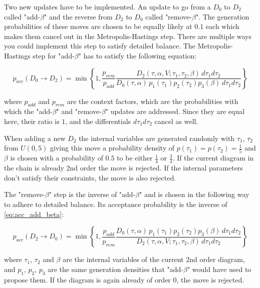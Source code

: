 \documentclass[a4paper, 11pt]{article}          %
\begin{document}
    Two new updates have to be implemented. An update to go from a $D_0$ to $D_2$ called "add-$\beta$" and the reverse from $D_2$ to $D_0$ called "remove-$\beta$". The generation probabilities of these moves are chosen to be equally likely at $0.1$ each which makes them cancel out in the Metropolis-Hastings step. There are multiple ways you could implement this step to satisfy detailed balance. The Metropolis-Hastings step for "add-$\beta$" has to satisfy the following equation:

    \begin{equation}\label{eq:acc_add_beta}
        p_{acc}(D_0 \rightarrow D_2) = \min\left\{ 1, \frac{p_{rem}}{p_{add}} \frac{D_2(\tau, \alpha, V; \tau_1, \tau_2, \beta) \, d\tau_1 d\tau_2}{D_0(\tau, \alpha) \, p_1(\tau_1) p_2(\tau_2) p_3(\beta) \, d\tau_1 d\tau_2} \right\}
    \end{equation}

    where $p_{add}$ and $p_{rem}$ are the context factors, which are the probabilities with which the "add-$\beta$" and "remove-$\beta$" updates are addressed. Since they are equal here, their ratio is $1$, and the differentials $d\tau_1 d\tau_2$ cancel as well.

    When adding a new $D_2$ the internal variables are generated randomly with $\tau_1$, $\tau_2$ from $U(0,5)$ giving this move a probability density of $p(\tau_1) = p(\tau_2)=\frac{1}{5}$ and $\beta$ is chosen with a probability of $0.5$ to be either $\frac{1}{4}$ or $\frac{3}{4}$. If the current diagram in the chain is already 2nd order the move is rejected. If the internal parameters don't satisfy their constraints, the move is also rejected.

    The "remove-$\beta$" step is the inverse of "add-$\beta$" and is chosen in the following way to adhere to detailed balance. Its acceptance probability is the inverse of \eqref{eq:acc_add_beta}:

    \begin{equation}\label{eq:acc_remove_beta}
        p_{acc}(D_2 \rightarrow D_0) = \min\left\{ 1, \frac{p_{add}}{p_{rem}} \frac{D_0(\tau, \alpha) \, p_1(\tau_1) p_2(\tau_2) p_3(\beta) \, d\tau_1 d\tau_2}{D_2(\tau, \alpha, V; \tau_1, \tau_2, \beta) \, d\tau_1 d\tau_2} \right\}
    \end{equation}

    where $\tau_1$, $\tau_2$ and $\beta$ are the internal variables of the current 2nd order diagram, and $p_1$, $p_2$, $p_3$ are the same generation densities that "add-$\beta$" would have used to propose them. If the diagram is again already of order 0, the move is rejected.
\end{document}
